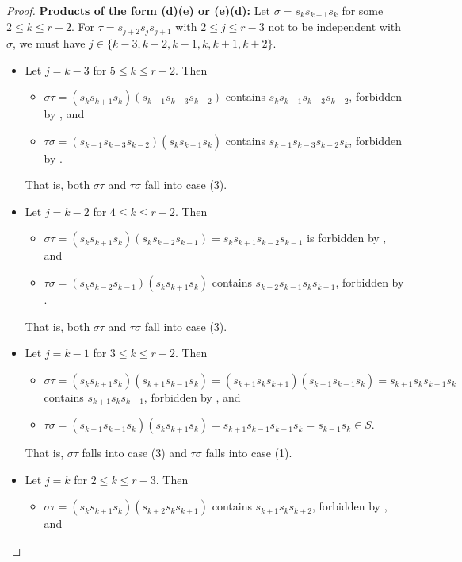 \documentclass[10pt,a4paper]{amsart}
\begin{document}
\begin{proof}
\noindent \textbf{Products of the form (d)(e) or (e)(d):}
    Let $\sigma=s_ks_{k+1}s_k$ for some $2\leq k\leq r-2$. For $\tau=s_{j+2}s_js_{j+1}$ with $2\leq j\leq r-3$ not to be independent with $\sigma$, we must have $j\in\{k-3,k-2,k-1,k,k+1,k+2\}$.
        \begin{itemize}
        \item Let $j=k-3$ for $5\leq k\leq r-2$. Then \begin{itemize}
            \item $\sigma\tau=(s_ks_{k+1}s_k)(s_{k-1}s_{k-3}s_{k-2})$ contains $s_ks_{k-1}s_{k-3}s_{k-2}$, forbidden by , and
            \item $\tau\sigma=(s_{k-1}s_{k-3}s_{k-2})(s_ks_{k+1}s_k)$ contains $s_{k-1}s_{k-3}s_{k-2}s_k$, forbidden by .
        \end{itemize}
        That is, both $\sigma\tau$ and $\tau\sigma$ fall into case (3).
        \item Let $j=k-2$ for $4\leq k\leq r-2$. Then \begin{itemize}
            \item $\sigma\tau=(s_ks_{k+1}s_k)(s_{k}s_{k-2}s_{k-1})=s_ks_{k+1}s_{k-2}s_{k-1}$ is forbidden by , and
            \item $\tau\sigma=(s_{k}s_{k-2}s_{k-1})(s_ks_{k+1}s_k)$ contains $s_{k-2}s_{k-1}s_ks_{k+1}$, forbidden by .
        \end{itemize}
        That is, both $\sigma\tau$ and $\tau\sigma$ fall into case (3).
        \item Let $j=k-1$ for $3\leq k\leq r-2$. Then \begin{itemize}
            \item $\sigma\tau=(s_ks_{k+1}s_k)(s_{k+1}s_{k-1}s_{k}) = (s_{k+1}s_ks_{k+1})(s_{k+1}s_{k-1}s_k) = s_{k+1}s_ks_{k-1}s_k$ contains \newline $s_{k+1}s_ks_{k-1}$, forbidden by , and
            \item $\tau\sigma=(s_{k+1}s_{k-1}s_{k})(s_ks_{k+1}s_k) = s_{k+1}s_{k-1}s_{k+1}s_k = s_{k-1}s_k\in S$.
        \end{itemize}
        That is, $\sigma\tau$ falls into case (3) and $\tau\sigma$ falls into case (1).
        \item Let $j=k$ for $2\leq k\leq r-3$. Then \begin{itemize}
            \item $\sigma\tau=(s_ks_{k+1}s_k)(s_{k+2}s_{k}s_{k+1})$ contains $s_{k+1}s_ks_{k+2}$, forbidden by , and

\end{itemize}
\end{itemize}
\end{proof}
\end{document}
